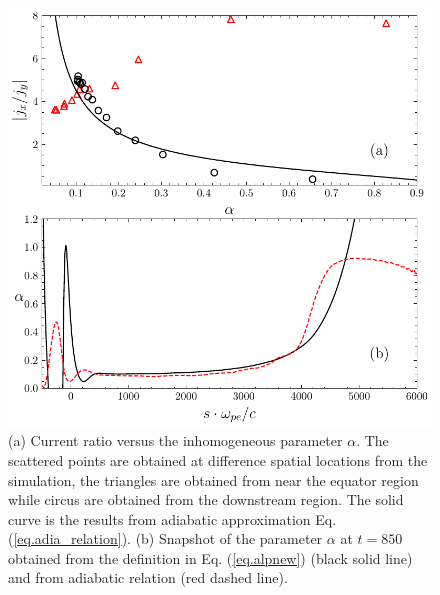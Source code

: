 \begin{figure}
    \centering
    \includegraphics[scale=0.5]{img/alpha.pdf}
    \caption{(a) Current ratio versus the inhomogeneous parameter $\alpha$. The scattered points are obtained at difference spatial locations from the simulation, the triangles are obtained from near the equator region while circus are obtained from the downstream region. 
    The solid curve is the results from adiabatic approximation Eq. (\ref{eq.adia_relation}). 
    (b) Snapshot  of the parameter $\alpha$ at $t = 850$ obtained  from the definition in Eq. (\ref{eq.alpnew}) (black solid line) and  from adiabatic relation (red dashed line).
    }
    \label{fig.adiabatic}
\end{figure}



